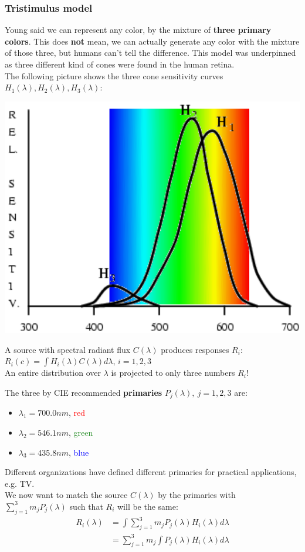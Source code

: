 \documentclass[a4paper, fontsize=8pt, landscape, DIV=1]{scrartcl}
\begin{document}
\begin{multicols*}{4}
		\subsubsection{Tristimulus model}
		Young said we can represent any color, by the mixture of \textbf{three primary colors}. This does \textbf{not} mean, we can actually generate any color with the mixture of those three, but humans can't tell the difference. This model was underpinned as three different kind of cones were found in the human retina.\\
		The following picture shows the three cone sensitivity curves $H_1(\lambda), H_2(\lambda), H_3(\lambda)$:
		\begin{center}
			\includegraphics[width=0.8\columnwidth]{images/FeatureExt/cone_sensit.png}\\
		\end{center}
		A source with spectral radiant flux $C(\lambda)$ produces responses $R_i$:\\
		$R_i(c)=\int H_i(\lambda)C(\lambda)d\lambda$, $i=1,2,3$\\
		An entire distribution over $\lambda$ is projected to only three numbers $R_i$!
		\par 
		The three by CIE recommended \textbf{primaries} $P_j(\lambda),\ j=1,2,3$ are: 
		\begin{itemize}[noitemsep]
			\item $\lambda_1=700.0nm$, \textcolor{red}{red}
			\item $\lambda_2=546.1nm$, \textcolor{ForestGreen}{green}
			\item $\lambda_3=435.8nm$, \textcolor{blue}{blue}
		\end{itemize}
		Different organizations have defined different primaries for practical applications, e.g. TV.\\
		We now want to match the source $C(\lambda)$ by the primaries with $\sum_{j=1}^{3}m_jP_j(\lambda)$ such that $R_i$ will be the same:
		\begin{align*}
			R_i(\lambda)&=\int\sum_{j=1}^{3}m_jP_j(\lambda)H_i(\lambda)d\lambda\\
						&=\sum_{j=1}^{3}m_j\int P_j(\lambda)H_i(\lambda)d\lambda
		\end{align*}
		

\end{multicols*}
\end{document}
